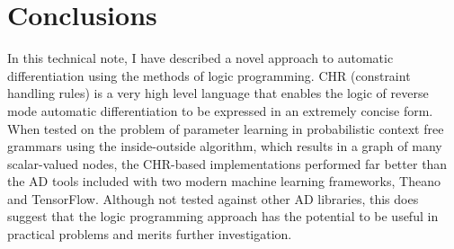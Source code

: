 \section{Conclusions}

In this technical note, I have described a novel approach to automatic differentiation
using the methods of logic programming. CHR (constraint handling rules) is a very
high level language that enables the logic of reverse mode automatic differentiation to be 
expressed in an extremely concise form. When tested on the problem of parameter learning
in probabilistic context free grammars using the inside-outside algorithm, which
results in a graph of many scalar-valued nodes, the CHR-based implementations
performed far better than the AD tools included with two modern machine learning
frameworks, Theano and TensorFlow. Although not tested against other AD libraries,
this does suggest that the logic programming approach has the potential to be useful
in practical problems and merits further investigation.


